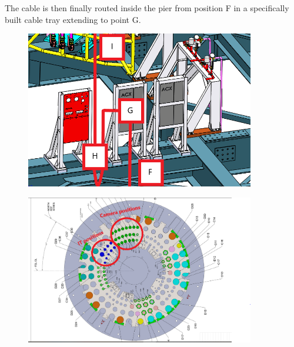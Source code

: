 \newpage 

  The cable is then finally routed inside the pier from position F in a specifically built cable tray extending to point G.

\begin{figure}
  \centering
  \includegraphics[width=10cm]{images/21-1.png}
\end{figure}

\begin{figure}
  \centering
  \includegraphics[width=10cm]{images/22.png}
\end{figure}

